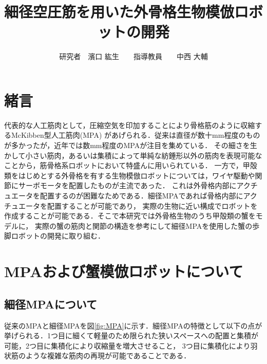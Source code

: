 \documentclass{jarticle}
\begin{document}

\title{
細径空圧筋を用いた外骨格生物模倣ロボットの開発
}
\author{
研究者　濱口 紘生　　指導教員　　中西 大輔
}

\maketitle

\thispagestyle{empty}  %

\section{緒言}

代表的な人工筋肉として，圧縮空気を印加することにより骨格筋のように収縮するMcKibben型人工筋肉(MPA)
があげられる．従来は直径が数十mm程度のものが多かったが，近年では数mm程度のMPAが注目を集めている\cite{wakimoto}．
その細さを生かして小さい筋肉，あるいは集積によって単純な紡錘形以外の筋肉を表現可能なことから，筋骨格系ロボットにおいて特盛んに用いられている\cite{wakimoto}．
一方で，甲殻類をはじめとする外骨格を有する生物模倣ロボットについては，ワイヤ駆動や関節にサーボモータを配置したものが主流であった\cite{crabrobot}．
これは外骨格内部にアクチュエータを配置するのが困難なためである．細径MPAであれば骨格内部にアクチュエータを配置することが可能であり，
実際の生物に近い構成でロボットを作成することが可能である．そこで本研究では外骨格生物のうち甲殻類の蟹をモデルに，
実際の蟹の筋肉と関節の構造を参考にして細径MPAを使用した蟹の歩脚ロボットの開発に取り組む．

\vspace*{-2mm}
\section{MPAおよび蟹模倣ロボットについて}

\vspace*{-1mm}
\subsection{細径MPAについて}

従来のMPAと細径MPAを図\ref{fig:MPA}に示す．細径MPAの特徴として以下の点が挙げられる．1つ目に細くて軽量のため限られた狭いスペースへの配置と集積が可能，2つ目に集積化により収縮量を増大させること，
3つ目に集積化により羽状筋のような複雑な筋肉の再現が可能であることである．
\end{document}
